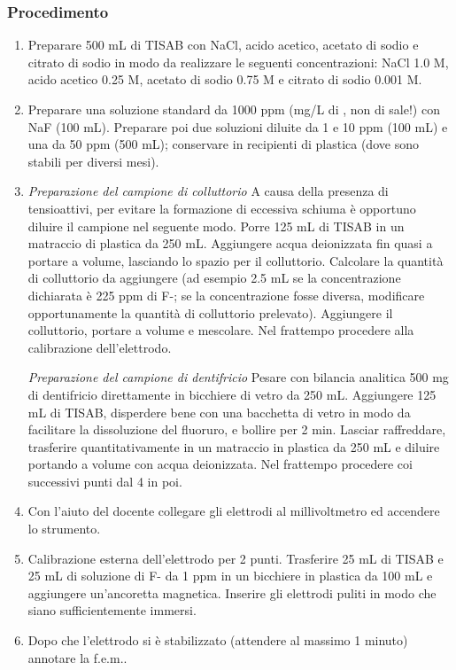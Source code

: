 \subsubsection{Procedimento}
\begin{enumerate}
\item Preparare 500 mL di TISAB con NaCl, acido acetico, acetato di sodio e citrato di sodio in modo da realizzare le seguenti concentrazioni: NaCl 1.0 M, acido acetico 0.25 M, acetato di sodio 0.75 M e citrato di sodio 0.001 M.
\item Preparare una soluzione standard da 1000 ppm (mg/L di , non di sale!) con NaF (100 mL). Preparare poi due soluzioni diluite da 1 e 10 ppm (100 mL) e una da 50 ppm (500 mL); conservare in recipienti di plastica (dove sono stabili per diversi mesi).
\item \textit{Preparazione del campione di colluttorio} A causa della presenza di tensioattivi, per evitare la formazione di eccessiva schiuma è opportuno diluire il campione nel seguente modo. Porre 125 mL di TISAB in un matraccio di plastica da 250 mL. Aggiungere acqua deionizzata fin quasi a portare a volume, lasciando lo spazio per il colluttorio. Calcolare la quantità di colluttorio da aggiungere (ad esempio 2.5 mL se la concentrazione dichiarata è 225 ppm di F-; se la concentrazione fosse diversa, modificare opportunamente la quantità di colluttorio prelevato). Aggiungere il colluttorio, portare a volume e mescolare. Nel frattempo procedere alla calibrazione dell'elettrodo.\par
\textit{Preparazione del campione di dentifricio} Pesare con bilancia analitica 500 mg di dentifricio direttamente in bicchiere di vetro da 250 mL. Aggiungere 125 mL di TISAB, disperdere bene con una bacchetta di vetro in modo da facilitare la dissoluzione del fluoruro, e bollire per 2 min. Lasciar raffreddare, trasferire quantitativamente in un matraccio in plastica da 250 mL e diluire portando a volume con acqua deionizzata. Nel frattempo procedere coi successivi punti dal 4 in poi.
\item Con l'aiuto del docente collegare gli elettrodi al millivoltmetro ed accendere lo strumento.
\item Calibrazione esterna dell'elettrodo per 2 punti. Trasferire 25 mL di TISAB e 25 mL di soluzione di F- da 1 ppm in un bicchiere in plastica da 100 mL e aggiungere un'ancoretta magnetica. Inserire gli elettrodi puliti in modo che siano sufficientemente immersi.
\item Dopo che l'elettrodo si è stabilizzato (attendere al massimo 1 minuto) annotare la f.e.m..

\end{enumerate}
